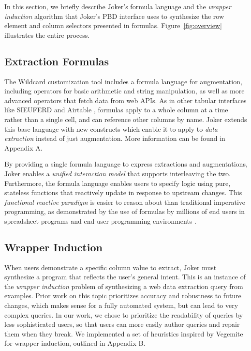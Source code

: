 \documentclass[sigconf,10pt]{acmart}
\begin{document}
In this section, we briefly describe Joker's formula language and the
\emph{wrapper induction} \citep{kushmerick2000} algorithm that Joker's
PBD interface uses to synthesize the row element and column selectors
presented in formulas. Figure~\ref{fig:overview} illustrates the entire
process.

\hypertarget{extraction-formulas}{%
\subsection{Extraction Formulas}\label{extraction-formulas}}

The Wildcard customization tool includes a formula language for
augmentation, including operators for basic arithmetic and string
manipulation, as well as more advanced operators that fetch data from
web APIs. As in other tabular interfaces like SIEUFERD \citep{bakke2016}
and Airtable \citep{2021f}, formulas apply to a whole column at a time
rather than a single cell, and can reference other columns by name.
Joker extends this base language with new constructs which enable it to
apply to \emph{data extraction} instead of just augmentation. More
information can be found in Appendix A.

By providing a single formula language to express extractions and
augmentations, Joker enables a \emph{unified interaction model} that
supports interleaving the two. Furthermore, the formula language enables
users to specify logic using pure, stateless functions that reactively
update in response to upstream changes. This \emph{functional reactive
paradigm} is easier to reason about than traditional imperative
programming, as demonstrated by the use of formulas by millions of end
users in spreadsheet programs and end-user programming environments
\citep{2021g, 2021h, 2021f, 2021a, 2021c, chang2014}.

\hypertarget{wrapper-induction}{%
\subsection{Wrapper Induction}\label{wrapper-induction}}

When users demonstrate a specific column value to extract, Joker must
synthesize a program that reflects the user's general intent. This is an
instance of the \emph{wrapper induction} problem of synthesizing a web
data extraction query from examples. Prior work on this topic
\citep{kushmerick2000, furche2016} prioritizes accuracy and robustness
to future changes, which makes sense for a fully automated system, but
can lead to very complex queries. In our work, we chose to prioritize
the readability of queries by less sophisticated users, so that users
can more easily author queries and repair them when they break. We
implemented a set of heuristics inspired by Vegemite \citep{lin2009} for
wrapper induction, outlined in Appendix B.
\end{document}

